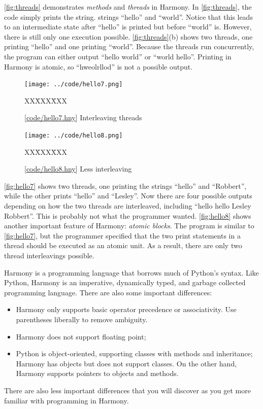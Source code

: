 \documentclass{report}
\newcommand{\harmonysource}[1]{
\begin{tabbing}
XX\=XXX\=XXX\kill
    
\end{tabbing}
}
\newcommand{\harmonylink}[1]{%
[\href{https://harmony.cs.cornell.edu/#1}{\underline{#1}}]%
}
\newenvironment{code}{
\tcolorbox
}{
\endtcolorbox
}
\begin{document}
\autoref{fig:threads} demonstrates \emph{methods} and \emph{threads} in Harmony.
In \autoref{fig:threads}, the code simply prints the string.
strings ``hello'' and ``world''.  Notice that this leads to an intermediate
state after ``hello'' is printed but before ``world'' is.  However, there
is still only one execution possible. \autoref{fig:threads}(b) shows two
threads, one printing ``hello'' and one printing ``world''.  Because the
threads run concurrently, the program can either output ``hello world'' or
``world hello''.  Printing in Harmony is atomic, so ``hweolrllod'' is not
a possible  output.

\begin{figure}
\begin{center}
\texttt{[image: ../code/hello7.png]}
\end{center}
\begin{code}
\harmonysource{hello7}
\end{code}
\caption{\harmonylink{code/hello7.hny} Interleaving threads}
\label{fig:hello7}
\end{figure}

\begin{figure}
\begin{center}
\texttt{[image: ../code/hello8.png]}
\end{center}
\begin{code}
\harmonysource{hello8}
\end{code}
\caption{\harmonylink{code/hello8.hny} Less interleaving}
\label{fig:hello8}
\end{figure}

\autoref{fig:hello7} shows two threads, one printing the strings
``hello'' and ``Robbert'', while the other prints ``hello'' and
``Lesley''.  Now there are four possible outputs depending on
how the two threads are interleaved, including
``hello hello Lesley Robbert''.  This is probably not what
the programmer wanted.  \autoref{fig:hello8} shows another
important feature of Harmony: \emph{atomic blocks}.  The
program is similar to \autoref{fig:hello7}, but the programmer
specified that the two print statements in a thread should
be executed as an atomic unit.  As a result, there are only
two thread interleavings possible.

Harmony is a programming language that borrows much of
Python's syntax.
Like Python, Harmony is an imperative,
dynamically typed, and garbage collected programming language.
There are also some important differences:
\begin{itemize}
\item Harmony only supports basic operator precedence or associativity.
Use parentheses liberally to remove ambiguity.
\item Harmony does not support floating point;
\item Python is object-oriented, supporting classes with methods and
inheritance; Harmony has objects but does not support classes.
On the other hand, Harmony supports pointers to objects and methods.
\end{itemize}
There are also less important differences that you will discover as
you get more familiar with programming in Harmony.
\end{document}
